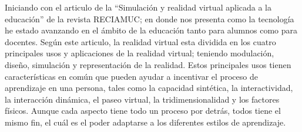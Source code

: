 Iniciando con el articulo de la “Simulación y realidad virtual aplicada a la educación” de la revista RECIAMUC; en donde nos presenta como la tecnología he estado avanzando en el ámbito de la educación tanto para alumnos como para docentes. Según este articulo, la realidad virtual esta dividida en los cuatro principales usos y aplicaciones de la realidad virtual; teniendo modulación, diseño, simulación y representación de la realidad. Estos principales usos tienen características en común que pueden ayudar a incentivar el proceso de aprendizaje en una persona, tales como la capacidad sintética, la interactividad, la interacción dinámica, el paseo virtual, la tridimensionalidad y los factores físicos. Aunque cada aspecto tiene todo un proceso por detrás, todos tiene el mismo fin, el cuál es el poder adaptarse a los diferentes estilos de aprendizaje. \cite{rodriguez2021simulacion}
